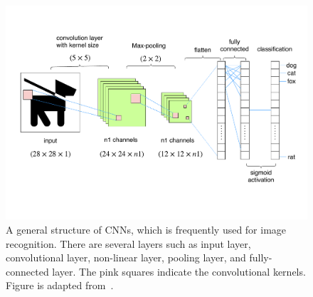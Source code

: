 \begin{figure}[h]
\centering
\includegraphics[width=1\textwidth]{images/cnn.pdf}
\caption[Structure of CNNs]{A general structure of CNNs, which is frequently used for image recognition. There are several layers such as input layer, convolutional layer, non-linear layer, pooling layer, and fully-connected layer. The pink squares indicate
the convolutional kernels. Figure is adapted from~\cite{hijazi2015using}.}
\label{fig:cnn}
\end{figure}



